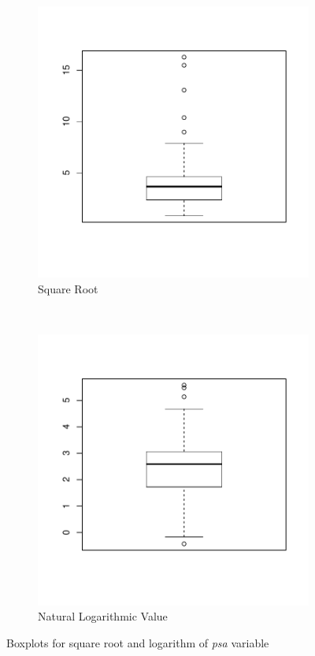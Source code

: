 \documentclass[12pt,letterpaper,titlepage,en-US]{article}
\begin{document}
\begin{figure}[H]
    \centering
    \begin{subfigure}[t]{0.5\textwidth}
        \centering
        \caption{Square Root}\label{obptsqrt}
        \includegraphics[width=.95\textwidth]{fig/boxplotpsasqrt.pdf}
    \end{subfigure}%
    ~
    \begin{subfigure}[t]{0.5\textwidth}
        \centering
        \caption{Natural Logarithmic Value}\label{obptlog}
        \includegraphics[width=.95\textwidth]{fig/boxplotpsalog.pdf}
    \end{subfigure}
    \caption{Boxplots for square root and logarithm of \textit{psa} variable}\label{obpt}
\end{figure}
\end{document}
